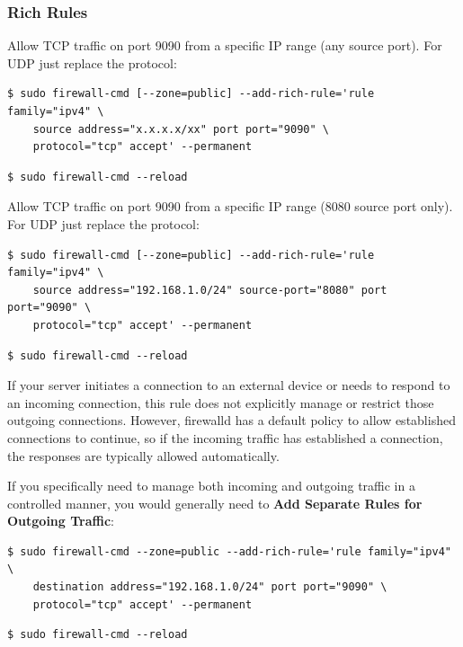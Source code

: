 \documentclass{article}
\newenvironment{blocktemplateII}[1]{%
    \tcolorbox[beamer,%
    noparskip,breakable,
    colframe=Green,%
    colbacklower=LimeGreen!75!LightGreen,%
    title=#1]}%
    {\endtcolorbox}
\newenvironment{codetemplate}[1][]{%
  \mybasecolorbox[#1]
  \itshape
}{%
  \endmybasecolorbox
}
\begin{document}
\subsubsection{Rich Rules}
Allow TCP traffic on port 9090 from a specific IP range (any source port). For UDP just replace the protocol:
\begin{codetemplate}
\begin{verbatim}
$ sudo firewall-cmd [--zone=public] --add-rich-rule='rule family="ipv4" \
    source address="x.x.x.x/xx" port port="9090" \
    protocol="tcp" accept' --permanent
\end{verbatim}
\end{codetemplate}
\begin{codetemplate}
\begin{verbatim}
$ sudo firewall-cmd --reload
\end{verbatim}
\end{codetemplate}

Allow TCP traffic on port 9090 from a specific IP range (8080 source port only). For UDP just replace the protocol:
\begin{codetemplate}
\begin{verbatim}
$ sudo firewall-cmd [--zone=public] --add-rich-rule='rule family="ipv4" \
    source address="192.168.1.0/24" source-port="8080" port port="9090" \
    protocol="tcp" accept' --permanent
\end{verbatim}
\end{codetemplate}
\begin{codetemplate}
\begin{verbatim}
$ sudo firewall-cmd --reload
\end{verbatim}
\end{codetemplate}

\begin{blocktemplateII}{Outgoing Traffic}
If your server initiates a connection to an external device or needs to respond to an incoming connection, this rule does not explicitly manage or restrict those outgoing connections. However, firewalld has a default policy to allow established connections to continue, so if the incoming traffic has established a connection, the responses are typically allowed automatically.
\end{blocktemplateII}

If you specifically need to manage both incoming and outgoing traffic in a controlled manner, you would generally need to \textbf{Add Separate Rules for Outgoing Traffic}:
\begin{codetemplate}
\begin{verbatim}
$ sudo firewall-cmd --zone=public --add-rich-rule='rule family="ipv4" \
    destination address="192.168.1.0/24" port port="9090" \
    protocol="tcp" accept' --permanent
\end{verbatim}
\end{codetemplate}
\begin{codetemplate}
\begin{verbatim}
$ sudo firewall-cmd --reload
\end{verbatim}
\end{codetemplate}
\end{document}

